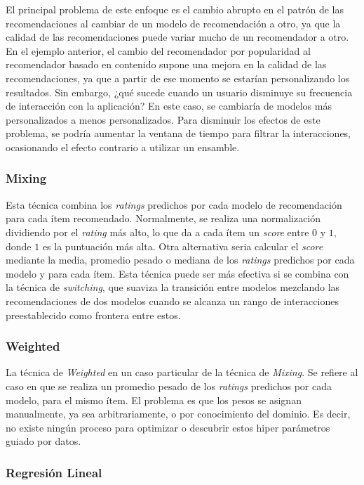 \documentclass[11pt,a4paper,twoside]{thesis}
\begin{document}
El principal problema de este enfoque es el cambio abrupto en el patrón de las
recomendaciones al cambiar de un modelo de recomendación a otro, ya que la
calidad de las recomendaciones puede variar mucho de un recomendador a otro. En
el ejemplo anterior, el cambio del recomendador por popularidad al recomendador
basado en contenido supone una mejora en la calidad de las recomendaciones, ya
que a partir de ese momento se estarían personalizando los resultados. Sin
embargo, ¿qué sucede cuando un usuario disminuye su frecuencia de interacción
con la aplicación? En este caso, se cambiaría de modelos más personalizados a
menos personalizados. Para disminuir los efectos de este problema, se podría
aumentar la ventana de tiempo para filtrar la interacciones, ocasionando el
efecto contrario a utilizar un ensamble.

\subsubsection{Mixing}

Esta técnica combina los \textit{ratings} predichos por cada modelo de
recomendación para cada ítem recomendado. Normalmente, se realiza una
normalización dividiendo por el \textit{rating} más alto, lo que da a cada ítem
un \textit{score} entre $0$ y $1$, donde $1$ es la puntuación más alta. Otra
alternativa seria calcular el \textit{score} mediante la media, promedio pesado
o mediana de los \textit{ratings} predichos por cada modelo y para cada ítem.
Esta técnica puede ser más efectiva si se combina con la técnica de
\textit{switching}, que suaviza la transición entre modelos mezclando las
recomendaciones de dos modelos cuando se alcanza un rango de interacciones
preestablecido como frontera entre estos.

\subsubsection{Weighted}

La técnica de \textit{Weighted} en un caso particular de la técnica de
\textit{Mixing}. Se refiere al caso en que se realiza un promedio pesado de los
\textit{ratings} predichos por cada modelo, para el mismo ítem. El problema es
que los pesos se asignan manualmente, ya sea arbitrariamente, o por
conocimiento del dominio. Es decir, no existe ningún proceso para optimizar o
descubrir estos hiper parámetros guiado por datos.

\subsubsection{Regresión Lineal}
\end{document}
